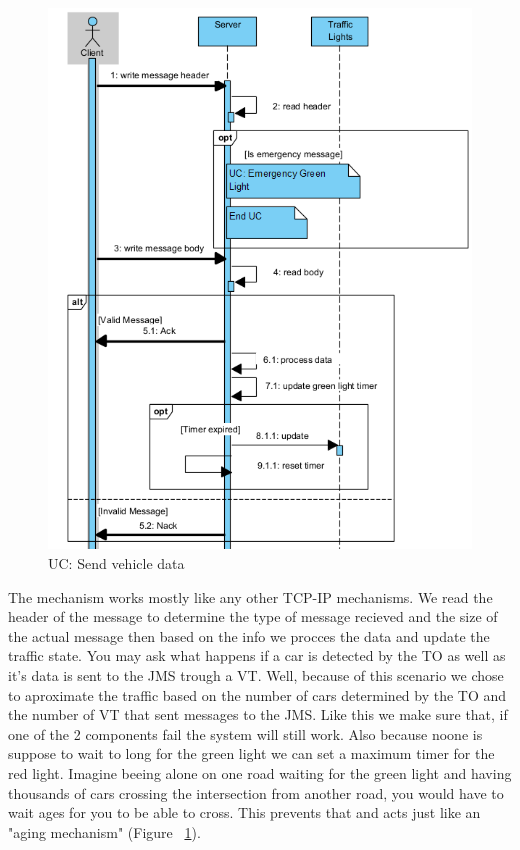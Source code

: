 \documentclass[17pt]{article}
\begin{document}
\begin{figure}[h!]
    \includegraphics[width=\textwidth]{UC/SendVehicleData.png}
    \caption{UC: Send vehicle data}
    \label{fig:UC_SendVehicleData}
\end{figure}

The mechanism works mostly like any other TCP-IP mechanisms.
We read the header of the message to determine the type of 
message recieved and the size of the actual message then
based on the info we procces the data and update the traffic 
state. You may ask what happens if a car is detected by the 
TO as well as it's data is sent to the JMS trough a VT.
Well, because of this scenario we chose to aproximate the 
traffic based on the number of cars determined by the TO 
and the number of VT that sent messages to the JMS. Like this
we make sure that, if one of the 2 components fail the system
will still work. Also because noone is suppose to wait to long
for the green light we can set a maximum timer for the red light.
Imagine beeing alone on one road waiting for the green light and
having thousands of cars crossing the intersection from another road,
you would have to wait ages for you to be able to cross. This prevents that
and acts just like an "aging mechanism" (Figure ~\ref{fig:UC_SendVehicleData}).
\end{document}
